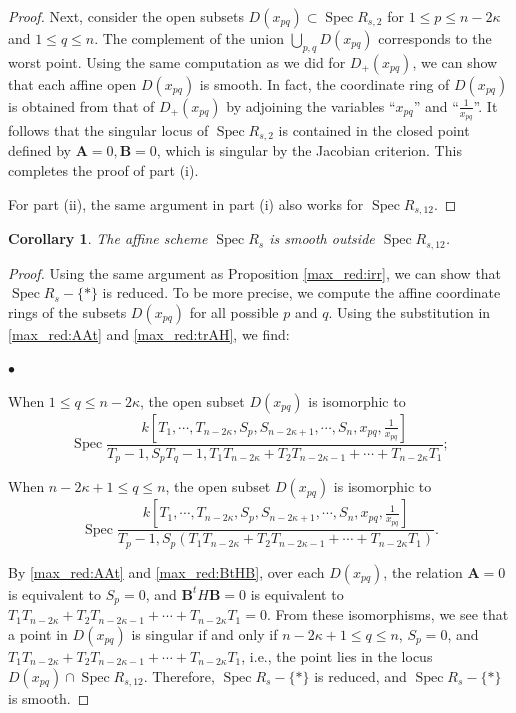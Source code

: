\documentclass[pdflatex,sn-mathphys-num]{sn-jnl}%
\theoremstyle{thmstyleone}%
\newtheorem{corollary}[subsubsection]{Corollary}%
\theoremstyle{thmstyletwo}%
\numberwithin{equation}{subsection}
\theoremstyle{thmstylethree}%
\newcommand{\bA}{\ensuremath{\mathbf{A}}\xspace}
\newcommand{\bB}{\ensuremath{\mathbf{B}}\xspace}
\DeclareMathOperator{\Spec}{Spec}
\newenvironment{altitemize}
	{\begin{list}
			{$\bullet$}
			{\setlength{\labelwidth}{0pt}
				\setlength{\itemindent}{5pt}
				\setlength{\labelsep}{5pt}
				\setlength{\leftmargin}{0pt}
				\setlength{\itemsep}{\the\smallskipamount}
		}}
		{\end{list}}
\begin{document}
\begin{proof}
Next, consider the open subsets $D(x_{pq})\subset \Spec R_{s,2}$ for $1\leq p\leq n-2\kappa$ and $1\leq q\leq n$. The complement of the union $\bigcup_{p,q}D(x_{pq})$ corresponds to the worst point.
Using the same computation as we did for $D_+(x_{pq})$, we can show that each affine open $D(x_{pq})$ is smooth. 
In fact, the coordinate ring of $D(x_{pq})$ is obtained from that of $D_+(x_{pq})$ by adjoining the variables ``$x_{pq}$'' and ``$\frac{1}{x_{pq}}$''.
It follows that the singular locus of $\Spec R_{s,2}$ is contained in the closed point defined by $\bA=0,\bB=0$, which is singular by the Jacobian criterion. 
This completes the proof of part (i).

For part (ii), the same argument in part (i) also works for $\Spec R_{s,12}$.
\end{proof}

\begin{corollary}\label{max_red:sing-locus}
    The affine scheme $\Spec R_s$ is smooth outside $\Spec R_{s,12}$.
\end{corollary}
\begin{proof}
Using the same argument as Proposition \ref{max_red:irr}, we can show that $\Spec R_s-\{*\}$ is reduced. 
To be more precise, we compute the affine coordinate rings of the subsets $D(x_{pq})$ for all possible $p$ and $q$. Using the substitution in \eqref{max_red:AAt} and \eqref{max_red:trAH}, we find:
\begin{altitemize}
\item When $1\leq q\leq n-2\kappa$, the open subset $D(x_{pq})$ is isomorphic to
\begin{equation*}
    \Spec\frac{k[T_1,\cdots,T_{n-2\kappa},S_p,S_{n-2\kappa+1},\cdots,S_n,x_{pq},\frac{1}{x_{pq}}]}{T_p-1,S_pT_q-1,T_1T_{n-2\kappa}+T_2T_{n-2\kappa-1}+\cdots+T_{n-2\kappa} T_1};
\end{equation*}
\item When $n-2\kappa+1\leq q\leq n$, the open subset $D(x_{pq})$ is isomorphic to
\begin{equation*}
    \Spec\frac{k[T_1,\cdots,T_{n-2\kappa},S_p,S_{n-2\kappa+1},\cdots,S_n,x_{pq},\frac{1}{x_{pq}}]}{T_p-1,S_p(T_1T_{n-2\kappa}+T_2T_{n-2\kappa-1}+\cdots+T_{n-2\kappa} T_1)}.
\end{equation*}
\end{altitemize}
By \eqref{max_red:AAt} and \eqref{max_red:BtHB}, over each $D(x_{pq})$, the relation $\bA=0$ is equivalent to $S_p=0$, and $\bB^tH\bB=0$ is equivalent to $T_1T_{n-2\kappa}+T_2T_{n-2\kappa-1}+\cdots+T_{n-2\kappa} T_1=0$.
From these isomorphisms, we see that a point in $D(x_{pq})$ is singular if and only if $n-2\kappa+1\leq q\leq n$, $S_p=0$, and $T_1T_{n-2\kappa}+T_2T_{n-2\kappa-1}+\cdots+T_{n-2\kappa} T_1$, i.e., the point lies in the locus $D(x_{pq})\cap \Spec R_{s,12}$.
Therefore, $\Spec R_s-\{*\}$ is reduced, and $\Spec R_s-\{*\}$ is smooth.
\end{proof}
\end{document}
